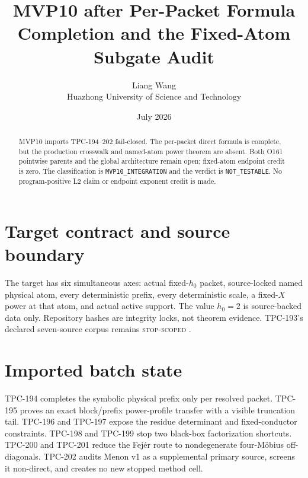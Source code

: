 \documentclass[11pt]{article}
\title{\textbf{MVP10 after Per-Packet Formula Completion and the Fixed-Atom Subgate Audit}}
\author{Liang Wang\\Huazhong University of Science and Technology}
\date{July 2026}
\begin{document}
\maketitle
\begin{abstract}
MVP10 imports TPC-194--202 fail-closed.  The per-packet direct formula is complete, but the production crosswalk and named-atom power theorem are absent.  Both O161 pointwise parents and the global architecture remain open; fixed-atom endpoint credit is zero.
The classification is \texttt{MVP10\_\allowbreak{}INTEGRATION} and the
verdict is \texttt{NOT\_\allowbreak{}TESTABLE}.  No program-positive L2
claim or endpoint exponent credit is made.
\end{abstract}

\section{Target contract and source boundary}
The target has six simultaneous axes: actual fixed-\(h_0\) packet,
source-locked named physical atom, every deterministic prefix, every
deterministic scale, a fixed-\(X\) power at that atom, and actual active
support.  The value \(h_0=2\) is source-backed data only.  Repository hashes
are integrity locks, not theorem evidence.  TPC-193's declared seven-source
corpus remains \textsc{stop-scoped} \citep{WangTPC193}.


\section{Imported batch state}
TPC-194 completes the symbolic physical prefix only per resolved packet.
TPC-195 proves an exact block/prefix power-profile transfer with a visible
truncation tail.  TPC-196 and TPC-197 expose the residue determinant and
fixed-conductor constraints.  TPC-198 and TPC-199 stop two black-box
factorization shortcuts.  TPC-200 and TPC-201 reduce the Fej\'er route to
nondegenerate four-M\"obius off-diagonals.  TPC-202 audits Menon v1 as a
supplemental primary source, screens it non-direct, and creates no new
stopped method cell.
\end{document}
